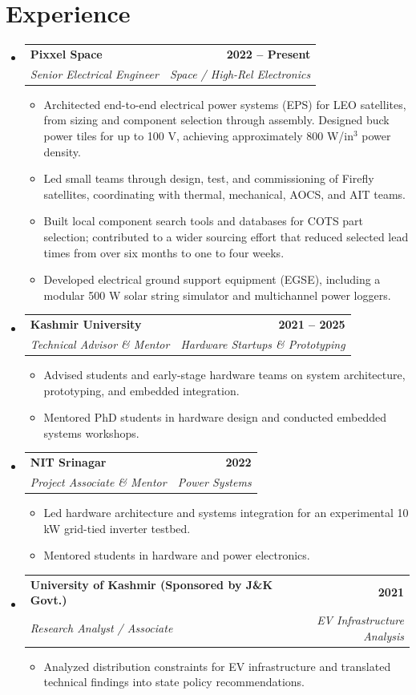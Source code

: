 \documentclass[11pt, a4paper]{article}
\makeatletter
\newcommand{\resumeItem}[1]{\item\small{#1}}
\newcommand{\resumeSubheading}[4]{
  \vspace{0.5ex}\item[]
    \begin{tabular*}{1.0\textwidth}[t]{l@{\extracolsep{\fill}}r}
      \textbf{\color{primary}#1} & \textbf{\color{primary}\small #2} \\
      \textit{\color{muted}\small#3} & \textit{\color{muted}\small #4} \\
    \end{tabular*}\vspace{-0.8ex}
}
\makeatother
\begin{document}
\section*{Experience}
\begin{itemize}[leftmargin=0em, label={}]
    \resumeSubheading
      {Pixxel Space}{2022 -- Present}
      {Senior Electrical Engineer}{Space / High-Rel Electronics}
      \begin{itemize}[leftmargin=1.5em, itemsep=1pt, topsep=1pt]
        \resumeItem{Architected end-to-end electrical power systems (EPS) for LEO satellites, from sizing and component selection through assembly. Designed buck power tiles for up to 100 V, achieving approximately 800 W/in$^3$ power density.}
        \resumeItem{Led small teams through design, test, and commissioning of Firefly satellites, coordinating with thermal, mechanical, AOCS, and AIT teams.}
        \resumeItem{Built local component search tools and databases for COTS part selection; contributed to a wider sourcing effort that reduced selected lead times from over six months to one to four weeks.}
        \resumeItem{Developed electrical ground support equipment (EGSE), including a modular 500 W solar string simulator and multichannel power loggers.}
      \end{itemize}

    \resumeSubheading
      {Kashmir University}{2021 -- 2025}
      {Technical Advisor \& Mentor}{Hardware Startups \& Prototyping}
      \begin{itemize}[leftmargin=1.5em, itemsep=1pt, topsep=1pt]
        \resumeItem{Advised students and early-stage hardware teams on system architecture, prototyping, and embedded integration.}
        \resumeItem{Mentored PhD students in hardware design and conducted embedded systems workshops.}
      \end{itemize}

    \resumeSubheading
      {NIT Srinagar}{2022}
      {Project Associate \& Mentor}{Power Systems}
      \begin{itemize}[leftmargin=1.5em, itemsep=1pt, topsep=1pt]
        \resumeItem{Led hardware architecture and systems integration for an experimental 10 kW grid-tied inverter testbed.}
        \resumeItem{Mentored students in hardware and power electronics.}
      \end{itemize}

    \resumeSubheading
      {University of Kashmir (Sponsored by J\&K Govt.)}{2021}
      {Research Analyst / Associate}{EV Infrastructure Analysis}
      \begin{itemize}[leftmargin=1.5em, itemsep=1pt, topsep=1pt]
        \resumeItem{Analyzed distribution constraints for EV infrastructure and translated technical findings into state policy recommendations.}
      \end{itemize}
\end{itemize}
\end{document}
